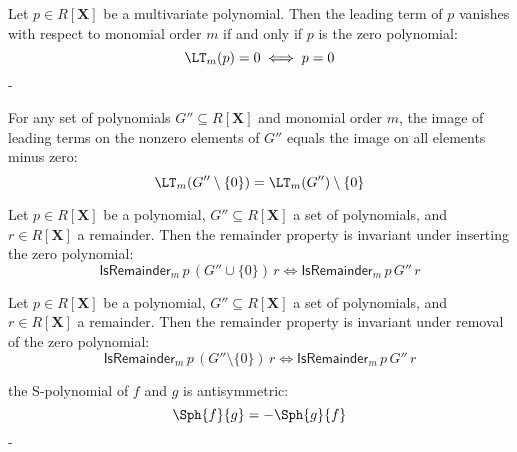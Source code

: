 \begin{lemma}\label{lm_eq_zero_iff}
  \leanok
  Let $p \in R[\mathbf{X}]$ be a multivariate polynomial. Then the leading term of $p$
vanishes with respect to monomial order $m$ if and only if $p$ is the zero polynomial:
\[
\LT_m(p) = 0 \iff p = 0
\]
-
\end{lemma}

\begin{lemma}\label{leadingTerm_image_sdiff_singleton_zero}
  \leanok
  For any set of polynomials $G'' \subseteq R[\mathbf{X}]$ and monomial order $m$,
the image of leading terms on the nonzero elements of $G''$ equals the image on all
elements minus zero:
\[
\LT_m(G'' \setminus \{0\}) = \LT_m(G'') \setminus \{0\}
\]

\end{lemma}

\begin{lemma}\label{isRemainder_of_insert_zero_iff_isRemainder}
  \leanok
  Let $p \in R[\mathbf{X}]$ be a polynomial, $G'' \subseteq R[\mathbf{X}]$ a set of polynomials,
and $r \in R[\mathbf{X}]$ a remainder. Then the remainder property is invariant under
inserting the zero polynomial:
\[
\mathsf{IsRemainder}_m\,p\,(G'' \cup \{0\})\,r \iff \mathsf{IsRemainder}_m\,p\,G''\,r
\]

\end{lemma}

\begin{lemma}\label{isRemainder_of_singleton_zero_iff_isRemainder}
  \leanok
  Let $p \in R[\mathbf{X}]$ be a polynomial, $G'' \subseteq R[\mathbf{X}]$ a set of polynomials,
and $r \in R[\mathbf{X}]$ a remainder. Then the remainder property is invariant under
removal of the zero polynomial:
\[
\mathsf{IsRemainder}_m\,p\,(G'' \setminus \{0\})\,r \iff \mathsf{IsRemainder}_m\,p\,G''\,r
\]

\end{lemma}

\begin{lemma}\label{sPolynomial_antisymm}
  \leanok
  the S-polynomial of $f$ and $g$ is antisymmetric:
\[
\Sph{f}{g} = -\Sph{g}{f}
\]
-
\end{lemma}

